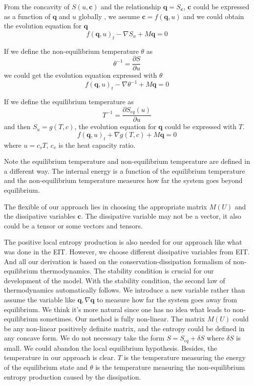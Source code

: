 \documentclass[a4paper]{article}
\begin{document}
From the concavity of $S(u,\mathbf{c})$ and the relationship $\mathbf{q}=S_\mathbf{c}$, $\mathbf{c}$ could be expressed as a function of $\mathbf{q}$ and $u$ globally \cite{friedrichs1971systems}, we assume $\mathbf{c}=f(\mathbf{q},u)$ and we could obtain the evolution equation for $\mathbf{q}$
\begin{equation}
f(\mathbf{q},u)_t-\nabla S_u + M \mathbf{q} = 0
\end{equation}

If we define the non-equilibrium temperature $\theta$ as
\begin{equation}
\theta^{-1}=\frac{\partial S}{\partial u}
\end{equation}
we could get the evolution equation expressed with $\theta$
\begin{equation}
f(\mathbf{q},u)_t-\nabla \theta^{-1} + M \mathbf{q} = 0
\end{equation}

If we define the equilibrium temperature as
\begin{equation}
T^{-1} = \frac{\partial S_{eq}(u)}{\partial u}
\end{equation}
and then $S_u = g(T,c)$, the evolution equation for $\mathbf{q}$ could be expressed with $T$.
\begin{equation}
f(\mathbf{q},u)_t + \nabla g(T,c) + M \mathbf{q} = 0
\end{equation}
where $u=c_v T$, $c_v$ is the heat capacity ratio.

Note the equilibrium temperature and non-equilibrium temperature are defined in a different way. The internal energy is a function of the equilibrium temperature and the non-equilibrium temperature measures how far the system goes beyond equilibrium.

The flexible of our approach lies in choosing the appropriate matrix $M(U)$ and the dissipative variables $\mathbf{c}$. The dissipative variable may not be a vector, it also could be a tensor or some vectors and tensors. 

The positive local entropy production is also needed for our approach like what was done in the EIT. However, we choose different dissipative variables from EIT. And all our derivation is based on the conservation-dissipation formalism of non-equilibrium thermodynamics. The stability condition is crucial for our development of the model. With the stability condition, the second law of thermodynamics automatically follows. We introduce a new variable rather than assume the variable like $\mathbf{q},\nabla \mathbf{q}$ to measure how far the system goes away from equilibrium. We think it's more natural  since one has no idea what leads to non-equilibrium sometimes. Our method is fully non-linear. The matrix $M(U)$ could be any non-linear positively definite matrix, and the entropy could be defined in any concave form. We do not necessary take the form $S=S_{eq}+\delta S$ where $\delta S$ is small. We could abandon the local equilibrium hypothesis. Besides, the temperature in our approach is clear. $T$ is the temperature measuring the energy of the equilibrium state and $\theta$ is the temperature measuring the non-equilibrium entropy production caused by the dissipation.  
\end{document}
